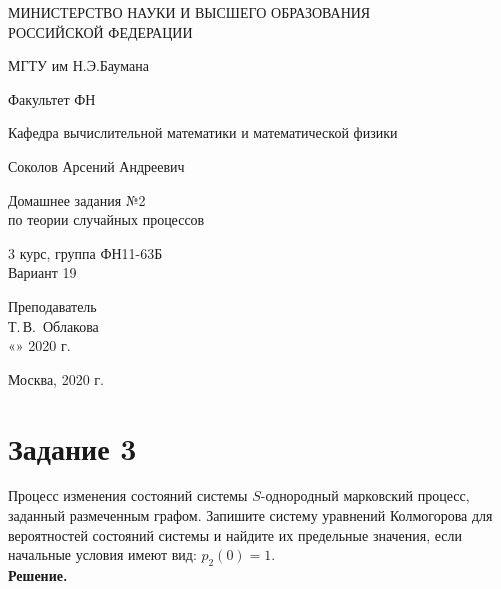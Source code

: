 \documentclass[14pt,a4paper]{scrartcl}
\begin{document}
	\begin{titlepage}
	\begin{center}
		\large
		МИНИСТЕРСТВО НАУКИ И ВЫСШЕГО ОБРАЗОВАНИЯ\\ РОССИЙСКОЙ ФЕДЕРАЦИИ
		
		\vspace{0.5cm}
		
		МГТУ им Н.Э.Баумана
		\vspace{0.25cm}
		
		Факультет ФН
		
		Кафедра вычислительной математики и математической физики
		\vfill
		
		
		Соколов Арсений Андреевич\\
		\vfill
		
		
		{\LARGE Домашнее задания №2 \\ по теории случайных процессов\\[2mm]
		}
		\bigskip
		
		3 курс, группа ФН11-63Б\\
		Вариант 19
	\end{center}
	\vfill
	
	\newlength{\ML}
	\hfill\begin{minipage}{0.4\textwidth}
		Преподаватель\\
		\underline{\hspace{3cm}} Т.\,В.~Облакова\\
		«\underline{\hspace{0.7cm}}» \underline{\hspace{1.71cm}} 2020 г.
	\end{minipage}%
	\bigskip
	
	
	\vfill
	
	\begin{center}
		Москва, 2020 г.
	\end{center}
\end{titlepage}

\section*{Задание 3}
Процесс изменения состояний системы $S$-однородный марковский процесс, заданный размеченным графом. Запишите систему уравнений Колмогорова для вероятностей состояний системы и найдите их предельные значения, если начальные условия имеют вид: $p_2 (0)=1$.\\
\textbf{Решение.}\\
\end{document}
